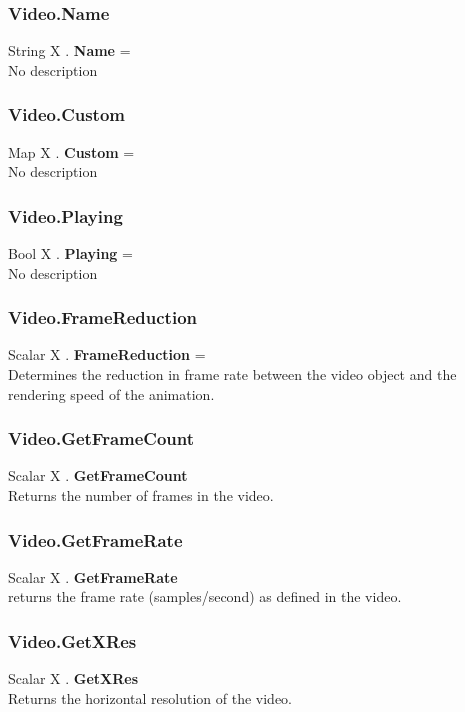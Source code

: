 \subsubsection{Video.Name \label{F:Video:Name}}
String X . \textbf{Name} = \\
No description

\subsubsection{Video.Custom \label{F:Video:Custom}}
Map X . \textbf{Custom} = \\
No description

\subsubsection{Video.Playing \label{F:Video:Playing}}
Bool X . \textbf{Playing} = \\
No description

\subsubsection{Video.FrameReduction \label{F:Video:FrameReduction}}
Scalar X . \textbf{FrameReduction} = \\
Determines the reduction in frame rate between the video object and the rendering speed of the animation.

\subsubsection{Video.GetFrameCount \label{F:Video:GetFrameCount}}
Scalar X . \textbf{GetFrameCount} \\
Returns the number of frames in the video.

\subsubsection{Video.GetFrameRate \label{F:Video:GetFrameRate}}
Scalar X . \textbf{GetFrameRate} \\
returns the frame rate (samples/second) as defined in the video.

\subsubsection{Video.GetXRes \label{F:Video:GetXRes}}
Scalar X . \textbf{GetXRes} \\
Returns the horizontal resolution of the video.

